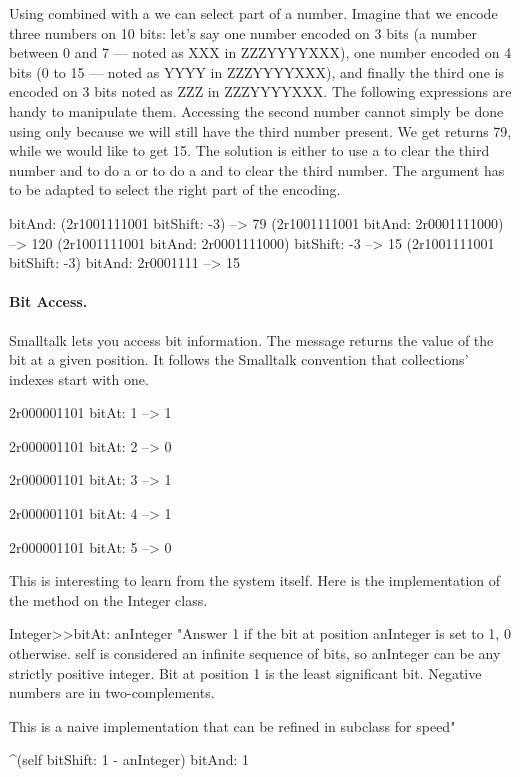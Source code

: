 \documentclass[a4paper,10pt,twoside]{book}
\begin{document}
Using  combined with a  we can select part of a number.
Imagine that we encode three numbers on 10 bits: let's say one number encoded on 3 bits (a number between 0 and 7 --- noted as XXX in ZZZYYYYXXX), one number encoded on 4 bits (0 to 15 --- noted as YYYY in ZZZYYYYXXX), and finally the third one is encoded on 3 bits noted as ZZZ in ZZZYYYYXXX. The following expressions are handy to manipulate them. Accessing the second number cannot simply be done using only  because we will still have the third number present. We get  returns 79, while we would like to get 15. The solution is either to use a  to clear the third number and to do a  or to do a  and to clear the third number. The  argument has to be adapted to select the right part of the encoding.

\begin{code}{bitAnd:}
(2r1001111001 bitShift: -3)
	--> 79
(2r1001111001 bitAnd: 2r0001111000)
    --> 120
(2r1001111001 bitAnd: 2r0001111000) bitShift: -3
   --> 15
(2r1001111001 bitShift: -3) bitAnd: 2r0001111   
	--> 15   
\end{code}

\paragraph*{Bit Access.}
Smalltalk lets you access bit information. The message  returns the value of the bit at a given position. It follows the Smalltalk convention that collections' indexes start with one. 

\begin{code}{}
2r000001101 bitAt: 1
	--> 1 
	
2r000001101 bitAt: 2
	--> 0 
			
2r000001101 bitAt: 3
	--> 1
	
2r000001101 bitAt: 4
	--> 1
	 
2r000001101 bitAt: 5
	--> 0 	 
\end{code}

This is interesting to learn from the system itself. Here is the implementation of the method  on the Integer class. 

\begin{code}{}
Integer>>bitAt: anInteger
	"Answer 1 if the bit at position anInteger is set to 1, 0 otherwise.
	self is considered an infinite sequence of bits, so anInteger can be any strictly positive integer.
	Bit at position 1 is the least significant bit.
	Negative numbers are in two-complements.
	
	This is a naive implementation that can be refined in subclass for speed"
	
	^(self bitShift: 1 - anInteger) bitAnd: 1
\end{code}
\end{document}
